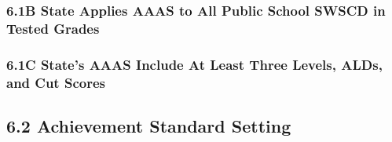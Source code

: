 \documentclass[]{book}
\begin{document}
\hypertarget{b-state-applies-aaas-to-all-public-school-swscd-in-tested-grades}{%
\subsubsection{6.1B State Applies AAAS to All Public School SWSCD in Tested Grades}\label{b-state-applies-aaas-to-all-public-school-swscd-in-tested-grades}}

\hypertarget{c-states-aaas-include-at-least-three-levels-alds-and-cut-scores}{%
\subsubsection{6.1C State's AAAS Include At Least Three Levels, ALDs, and Cut Scores}\label{c-states-aaas-include-at-least-three-levels-alds-and-cut-scores}}

\hypertarget{achievement-standard-setting}{%
\subsection{6.2 Achievement Standard Setting}\label{achievement-standard-setting}}


\end{document}
